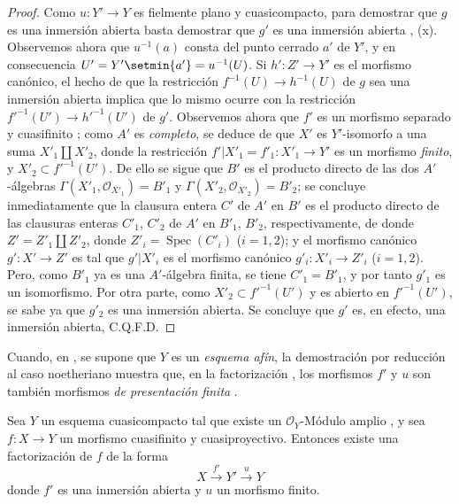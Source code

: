 \begin{proof}
Como $u:Y'\to Y$ es fielmente plano y cuasicompacto, para demostrar que $g$ es una inmersión abierta basta demostrar que $g'$ es una inmersión abierta , (x).
Observemos ahora que $u^{-1}(a)$ consta del punto cerrado $a'$ de $Y'$, y en consecuencia $U'=Y'\setmin\{a'\}=u^{-1}(U)$.
Si $h':Z'\to Y'$ es el morfismo canónico, el hecho de que la restricción $f^{-1}(U)\to h^{-1}(U)$ de $g$ sea una inmersión abierta implica que lo mismo ocurre con la restricción $f'^{-1}(U')\to h'^{-1}(U')$ de $g'$.
Observemos ahora que $f'$ es un morfismo separado y cuasifinito ; como $A'$ es \emph{completo}, se deduce de  que $X'$ es $Y'$-isomorfo a una suma $X'_1\amalg X'_2$, donde la restricción $f'|X'_1=f'_1:X'_1\to Y'$ es un morfismo \emph{finito}, y $X'_2\subset f'^{-1}(U')$.
De ello se sigue que $B'$ es el producto directo de las dos $A'$-álgebras $\Gamma(X'_1,\mathcal O_{X'_1})=B'_1$ y $\Gamma(X'_2,\mathcal O_{X'_2})=B'_2$; se concluye inmediatamente que la clausura entera $C'$ de $A'$ en $B'$ es el producto directo de las clausuras enteras $C'_1$, $C'_2$ de $A'$ en $B'_1$, $B'_2$, respectivamente, de donde $Z'=Z'_1\amalg Z'_2$, donde $Z'_i=\operatorname{Spec}(C'_i)$ ($i=1,2$); y el morfismo canónico $g':X'\to Z'$ es tal que $g'|X'_i$ es el morfismo canónico $g'_i:X'_i\to Z'_i$ ($i=1,2$).
Pero, como $B'_1$ ya es una $A'$-álgebra finita, se tiene $C'_1=B'_1$, y por tanto $g'_1$ es un isomorfismo.
Por otra parte, como $X'_2\subset f'^{-1}(U')$ y es abierto en $f'^{-1}(U')$, se
sabe ya que $g'_2$ es una inmersión abierta.
Se concluye que $g'$ es, en efecto, una inmersión abierta, C.Q.F.D.
\end{proof}

\begin{remark}[8.12.7]
\label{IV.8.12.7-fr}
Cuando, en , se supone que $Y$ es un \emph{esquema afín}, la demostración por reducción al caso noetheriano muestra que, en la factorización , los morfismos $f'$ y $u$ son también morfismos \emph{de presentación finita} .
\end{remark}

\begin{corollary}[8.12.8]
\label{IV.8.12.8-fr}
Sea $Y$ un esquema cuasicompacto tal que existe un $\mathcal O_Y$-Módulo amplio , y sea $f:X\to Y$ un morfismo cuasifinito y cuasiproyectivo.
Entonces existe una factorización de $f$ de la forma
\[
X\xrightarrow{f'}Y'\xrightarrow{u}Y
\]
donde $f'$ es una inmersión abierta y $u$ un morfismo finito.
\end{corollary}

